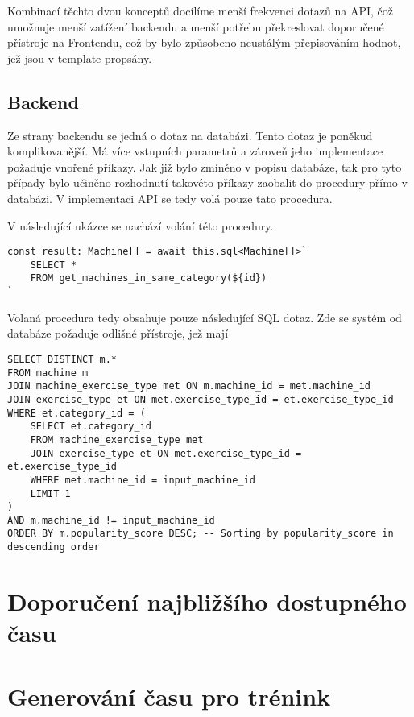 Kombinací těchto dvou konceptů docílíme menší frekvenci dotazů na API, čož umožnuje menší zatížení backendu a menší potřebu překreslovat doporučené přístroje na Frontendu, což by bylo způsobeno neustálým přepisováním hodnot, jež jsou v template propsány.

\subsection{Backend}
Ze strany backendu se jedná o dotaz na databázi. Tento dotaz je poněkud komplikovanější. Má více vstupních parametrů a zároveň jeho implementace požaduje vnořené příkazy. Jak již bylo zmíněno v popisu databáze, tak pro tyto případy bylo učiněno rozhodnutí takovéto příkazy zaobalit do procedury přímo v databázi. V implementaci API se tedy volá pouze tato procedura.

V následující ukázce se nachází volání této procedury.
\begin{lstlisting}
const result: Machine[] = await this.sql<Machine[]>`
    SELECT * 
    FROM get_machines_in_same_category(${id})
`
\end{lstlisting}

Volaná procedura tedy obsahuje pouze následující SQL dotaz. Zde se systém od databáze požaduje odlišné přístroje, jež mají 

\begin{lstlisting}
SELECT DISTINCT m.*
FROM machine m
JOIN machine_exercise_type met ON m.machine_id = met.machine_id
JOIN exercise_type et ON met.exercise_type_id = et.exercise_type_id
WHERE et.category_id = (
    SELECT et.category_id
    FROM machine_exercise_type met
    JOIN exercise_type et ON met.exercise_type_id = et.exercise_type_id
    WHERE met.machine_id = input_machine_id
    LIMIT 1
)
AND m.machine_id != input_machine_id
ORDER BY m.popularity_score DESC; -- Sorting by popularity_score in descending order
\end{lstlisting}

\section{Doporučení najbližšího dostupného času}

\section{Generování času pro trénink}
